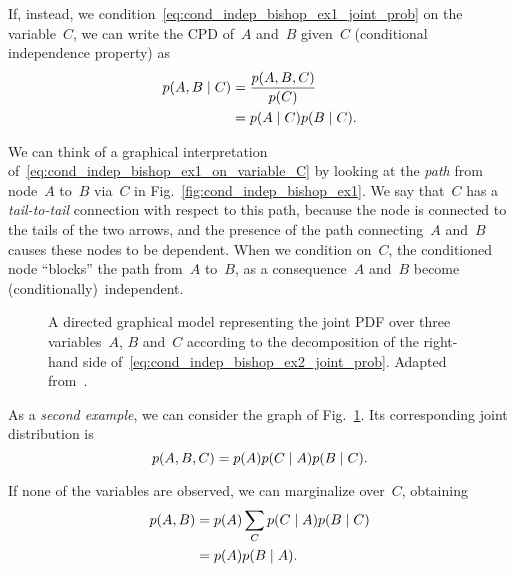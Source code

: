 If, instead, we condition~\eqref{eq:cond_indep_bishop_ex1_joint_prob} on the variable~$C$, we can write the \ac{CPD} of~$A$ and~$B$ given~$C$ (conditional independence property) as
\begin{align} \label{eq:cond_indep_bishop_ex1_on_variable_C}
\begin{split}
  p(A,B \mid C) &= \frac{p(A,B,C)}{p(C)} \\
                  &= p(A \mid C) p(B \mid C).
\end{split}
\end{align}

We can think of a graphical interpretation of~\eqref{eq:cond_indep_bishop_ex1_on_variable_C} by looking at the \emph{path} from node~$A$ to~$B$ via~$C$ in Fig.~\ref{fig:cond_indep_bishop_ex1}.
We say that~$C$ has a \emph{tail-to-tail} connection with respect to this path, because the node is connected to the tails of the two arrows, and the presence of the path connecting~$A$ and~$B$ causes these nodes to be dependent. \label{tail_to_tail}
When we condition on~$C$, the conditioned node ``blocks'' the path from~$A$ to~$B$, as a consequence~$A$ and~$B$ become (conditionally)~independent.

\begin{figure}
\centering
{}
\caption[A directed graphical model representing the joint \acf{PDF} over the variables of~\eqref{eq:cond_indep_bishop_ex2_joint_prob}.]{A directed graphical model representing the joint \acf{PDF} over three variables~$A$, $B$ and~$C$ according to the decomposition of the right-hand side of~\eqref{eq:cond_indep_bishop_ex2_joint_prob}. Adapted from~\cite{bishop:prml}.}
\label{fig:cond_indep_bishop_ex2}
\end{figure}

As a \emph{second example}, we can consider the graph of Fig.~\ref{fig:cond_indep_bishop_ex2}.
Its corresponding joint distribution is
\begin{equation} \label{eq:cond_indep_bishop_ex2_joint_prob}
  p(A,B,C) = p(A) p(C \mid A) p(B \mid C).
\end{equation}

If none of the variables are observed, we can marginalize over~$C$, obtaining
\begin{align*}
\begin{split}
  p(A,B) &= p(A) \sum_C p(C \mid A) p(B \mid C) \\
         &= p(A) p(B \mid A).
\end{split}
\end{align*}

